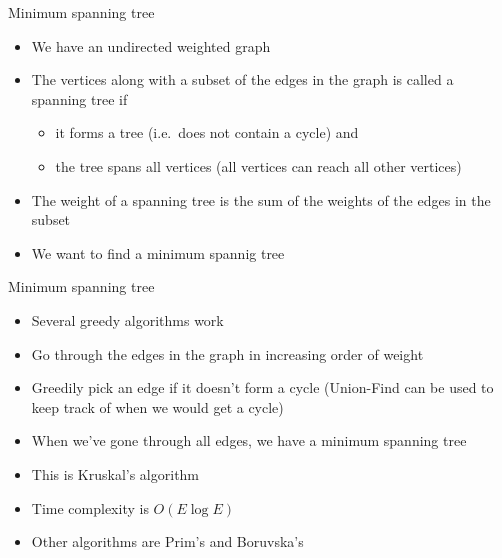 \documentclass{beamer}
\begin{document}
\begin{frame}[plain]{Minimum spanning tree}
    \begin{itemize}
        \item We have an undirected weighted graph
        \item The vertices along with a subset of the edges in the graph is called a spanning tree if
            \begin{itemize}
                \item it forms a tree (i.e.\ does not contain a cycle) and
                \item the tree spans all vertices (all vertices can reach all other vertices)
            \end{itemize}
        \vspace{10pt}
        \item The weight of a spanning tree is the sum of the weights of the edges in the subset
        \vspace{10pt}
        \item We want to find a minimum spannig tree
    \end{itemize}
\end{frame}

\begin{frame}[plain]{Minimum spanning tree}
    \begin{itemize}
        \item Several greedy algorithms work
        \vspace{10pt}
        \item Go through the edges in the graph in increasing order of weight
        \item Greedily pick an edge if it doesn't form a cycle (Union-Find can be used to keep track of when we would get a cycle)
        \item When we've gone through all edges, we have a minimum spanning tree
        \vspace{10pt}
        \item This is Kruskal's algorithm
        \item Time complexity is $O(E \log E)$
        \item Other algorithms are Prim's and Boruvska's
    \end{itemize}
\end{frame}
\end{document}

